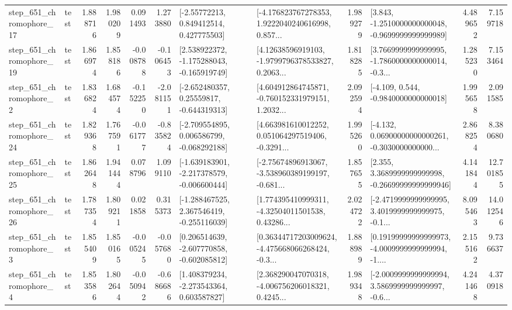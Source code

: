 \begin{tabular}{llrrrrllrlrr}
  step\_651\_chromophore\_17 &      test &      1.888716 &    1.980209 &      0.091493 &  1.273880 &     [-2.55772213, 0.849412514, 0.427775503] &  [-4.176823767278353, 1.9222040240616998, 0.857... &       1.989279 &  [3.843, -1.2510000000000048, -0.9699999999999989] &            4.489652 &          7.159718 \\
  step\_651\_chromophore\_19 &      test &      1.866974 &    1.858186 &     -0.008788 & -0.106453 &   [2.538922372, -1.175288043, -0.165919749] &  [4.12638596919103, -1.9799796378533827, 0.2063... &       1.818285 &  [3.7669999999999995, -1.7860000000000014, -0.3... &            1.285230 &          7.153464 \\
   step\_651\_chromophore\_2 &      test &      1.836824 &    1.684574 &     -0.152250 & -2.081151 &    [-2.652480357, 0.25559817, -0.644319313] &  [4.604912864745871, -0.760152331979151, 1.2032... &       2.092594 &               [-4.109, 0.544, -0.9840000000000018] &            1.995658 &          2.091585 \\
  step\_651\_chromophore\_24 &      test &      1.829368 &    1.767591 &     -0.061777 & -0.835824 &   [-2.709554895, 0.006586799, -0.068292188] &  [4.663981610012252, 0.051064297519406, -0.3291... &       1.995260 &  [-4.132, 0.06900000000000261, -0.3030000000000... &            2.868254 &          8.380680 \\
  step\_651\_chromophore\_25 &      test &      1.862648 &    1.941444 &      0.078796 &  1.099110 &  [-1.639183901, -2.217378579, -0.006600444] &  [-2.75674896913067, -3.538960389199197, -0.681... &       1.857655 &  [2.355, 3.3689999999999998, -0.26699999999999946] &            4.141844 &         12.701855 \\
  step\_651\_chromophore\_26 &      test &      1.787354 &    1.809211 &      0.021858 &  0.315373 &   [-1.288467525, 2.367546419, -0.255116039] &  [1.774395410999311, -4.32504011501538, 0.43286... &       2.024722 &  [-2.4719999999999995, 3.4019999999999975, -0.1... &            8.095463 &         14.012546 \\
   step\_651\_chromophore\_3 &      test &      1.855409 &    1.850165 &     -0.005245 & -0.057680 &   [0.206514639, -2.607770858, -0.602085812] &  [0.36344717203009624, -4.475668066268424, -0.3... &       1.888989 &  [0.19199999999999973, -4.0009999999999994, -1.... &            2.155162 &          9.736637 \\
   step\_651\_chromophore\_4 &      test &      1.853586 &    1.802644 &     -0.050942 & -0.686686 &    [1.408379234, -2.273543364, 0.603587827] &  [2.368290047070318, -4.006756206018321, 0.4245... &       1.989348 &  [-2.0009999999999994, 3.5869999999999997, -0.6... &            4.241468 &          4.370918 \\

\end{tabular}
